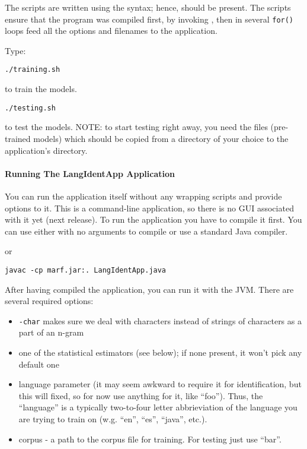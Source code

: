 The scripts are written using the  syntax; hence,  should be
present. The scripts ensure
that the program was compiled first, by invoking , then
in several \verb+for()+ loops feed all the options and filenames to the application.

Type:

\noindent
\verb+./training.sh+

to train the models.

\noindent
\verb+./testing.sh+

to test the models. NOTE: to start testing right away, you need the  files
(pre-trained models) which should be copied from a  directory
of your choice to the application's directory.

\paragraph{Running The LangIdentApp Application}
\label{sect:lang-ident-app}

You can run the application itself without any wrapping scripts
and provide options to it. This is a command-line application,
so there is no GUI associated with it yet (next release). To run the application
you have to compile it first. You can use either  with no
arguments to compile or use a standard Java compiler.

\noindent
{}

or

\noindent
\verb+javac -cp marf.jar:. LangIdentApp.java+

After having compiled the application, you can run it with the JVM.
There are several required options:

\begin{itemize}
\item
\verb+-char+ makes sure we deal with characters instead of strings of characters as a part of an n-gram

\item
one of the statistical estimators (see below); if none present, it won't pick any default one

\item
language parameter (it may seem awkward to require it for identification, but this will fixed,
so for now use anything for it, like ``foo''). Thus, the ``language'' is a typically two-to-four letter
abbrieviation of the language you are trying to train on (w.g. ``en'', ``es'', ``java'', etc.).

\item
corpus - a path to the corpus file for training. For testing just use ``bar''.
\end{itemize}

